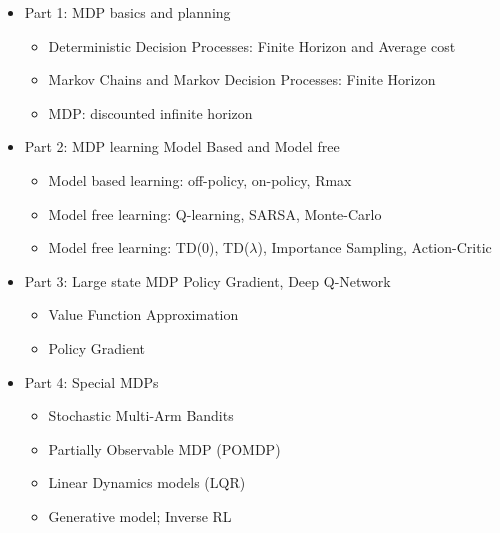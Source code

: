 \begin{itemize}
\item
Part 1: MDP basics and planning
\begin{itemize}
\item
Deterministic Decision Processes: Finite Horizon and Average cost
\item
Markov Chains and Markov Decision Processes: Finite Horizon
\item
MDP: discounted infinite horizon
\end{itemize}
\item
Part 2: MDP learning Model Based and Model free
\begin{itemize}
\item
Model based learning: off-policy, on-policy, Rmax
\item
Model free learning: Q-learning, SARSA, Monte-Carlo
\item
Model free learning: TD(0), TD($\lambda$), Importance Sampling,
Action-Critic
\end{itemize}
\item
Part 3: Large state MDP Policy Gradient, Deep Q-Network
\begin{itemize}
\item
Value Function Approximation
\item
Policy Gradient
\end{itemize}
\item
Part 4: Special MDPs
\begin{itemize}
\item
Stochastic Multi-Arm Bandits
\item
Partially Observable MDP (POMDP)
\item
Linear Dynamics models (LQR)
\item
Generative model; Inverse RL
\end{itemize}
\end{itemize}
